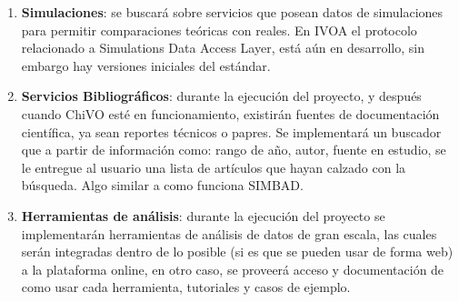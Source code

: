 \begin{enumerate}
	\item \textbf{Simulaciones}: se buscará sobre servicios que posean
datos de simulaciones para permitir comparaciones teóricas con reales. En IVOA
el protocolo relacionado a Simulations Data Access Layer, está aún en
desarrollo, sin embargo hay versiones iniciales del estándar.

	\item \textbf{Servicios Bibliográficos}: durante la ejecución del
proyecto, y después cuando ChiVO esté en funcionamiento, existirán fuentes de
documentación científica, ya sean reportes técnicos o papres. Se implementará
un buscador que a partir de información como: rango de año, autor, fuente en
estudio, se le entregue al usuario una lista de artículos que hayan calzado con
la búsqueda.  Algo similar a como funciona SIMBAD.

	\item \textbf{Herramientas de análisis}: durante la ejecución del
proyecto se implementarán herramientas de análisis de datos de gran escala, las
cuales serán integradas dentro de lo posible (si es que se pueden usar de forma
web) a la plataforma online, en otro caso, se proveerá acceso y documentación
de como usar cada herramienta, tutoriales y casos de ejemplo.
\end{enumerate}
